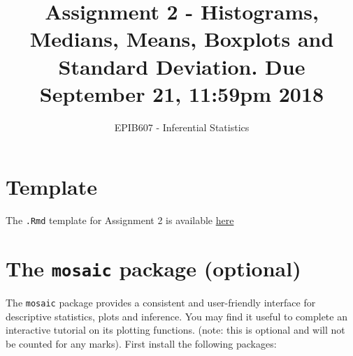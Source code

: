 \documentclass[letterpaper,9pt,twoside,printwatermark=false]{pinp}
\title{Assignment 2 - Histograms, Medians, Means, Boxplots and Standard
Deviation. Due September 21, 11:59pm 2018}
\author[a]{EPIB607 - Inferential Statistics}
\affil[a]{Fall 2018, McGill University}
\begin{document}
\verticaladjustment{-2pt}

\maketitle
\thispagestyle{firststyle}



\section*{Template}\label{template}

The \texttt{.Rmd} template for Assignment 2 is available
\href{https://github.com/sahirbhatnagar/EPIB607/raw/master/assignments/a2/a2_template.Rmd}{here}

\section*{\texorpdfstring{The \texttt{mosaic} package
(optional)}{The mosaic package (optional)}}\label{the-mosaic-package-optional}

The \texttt{mosaic} package provides a consistent and user-friendly
interface for descriptive statistics, plots and inference. You may find
it useful to complete an interactive tutorial on its plotting functions.
(note: this is optional and will not be counted for any marks). First
install the following packages:

\begin{Shaded}
\begin{Highlighting}[]
\NormalTok{(}\NormalTok{(}\NormalTok{,}\NormalTok{), } \NormalTok{)}
\end{Highlighting}
\end{Shaded}
\end{document}
